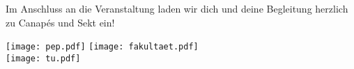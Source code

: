 \documentclass[parskip=half, fontsize=10pt, paper=a5]{scrartcl}
\begin{document}
\begin{center}
  Im Anschluss an die Veranstaltung laden wir dich und deine Begleitung herzlich zu Canapés und Sekt ein!
\end{center}


\vspace*{\fill}

\begin{center}
    \texttt{[image: pep.pdf]}%
    \hfill%
    \texttt{[image: fakultaet.pdf]}\\[.5cm]
    \texttt{[image: tu.pdf]}%
\end{center}
  
\end{document}
